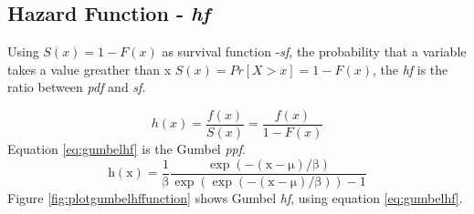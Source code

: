 \documentclass[12pt,twoside]{reedthesis}
\begin{document}
\hypertarget{hazard-function---hf}{%
\subsection{\texorpdfstring{Hazard Function - \emph{hf}}{Hazard Function - hf}}\label{hazard-function---hf}}

Using \(S(x) = 1 - F(x)\) as survival function -\emph{sf}, the probability that a variable takes a value greather than x \(S(x) = Pr[X > x] = 1 - F(x)\), the \emph{hf} is the ratio between \emph{pdf} and \emph{sf}.

\[
h(x) = \frac{f(x)}{S(x)} = \frac{f(x)}{1-F(x)}
\]
Equation \eqref{eq:gumbelhf} is the Gumbel \emph{ppf}.
\begin{equation}
\mathrm{
        h(x)= \frac{1}{\beta}\frac{\exp(-(x-\mu)/\beta)}{\exp(\exp(-(x-\mu)/\beta))-1}
       }
  \label{eq:gumbelhf}
\end{equation}
Figure \ref{fig:plotgumbelhffunction} shows Gumbel \emph{hf}, using equation \eqref{eq:gumbelhf}.
\end{document}
